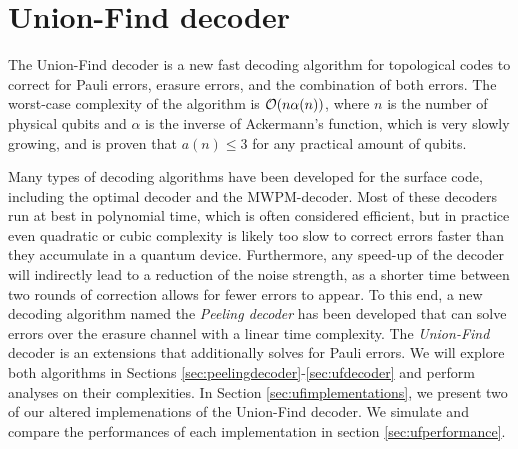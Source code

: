 \chapter{Union-Find decoder}\label{ch:UFdecoder}
The Union-Find decoder is a new fast decoding algorithm for topological codes to correct for Pauli errors, erasure errors, and the combination of both errors. The worst-case complexity of the algorithm is $\mathcal{O}(n\alpha(n))$, where $n$ is the number of physical qubits and $\alpha$ is the inverse of Ackermann's function, which is very slowly growing, and is proven that $a(n)\leq 3$ for any practical amount of qubits.

Many types of decoding algorithms have been developed for the surface code, including the optimal decoder and the MWPM-decoder. Most of these decoders run at best in polynomial time, which is often considered efficient, but in practice even quadratic or cubic complexity is likely too slow to correct errors faster than they accumulate in a quantum device. Furthermore, any speed-up of the decoder will indirectly lead to a reduction of the noise strength, as a shorter time between two rounds of correction allows for fewer errors to appear. To this end, a new decoding algorithm named the \emph{Peeling decoder} has been developed that can solve errors over the erasure channel with a linear time complexity. The \emph{Union-Find} decoder is an extensions that additionally solves for Pauli errors. We will explore both algorithms in Sections \ref{sec:peelingdecoder}-\ref{sec:ufdecoder} and perform analyses on their complexities. In Section \ref{sec:ufimplementations}, we present two of our altered implemenations of the Union-Find decoder. We simulate and compare the performances of each implementation in section \ref{sec:ufperformance}.

